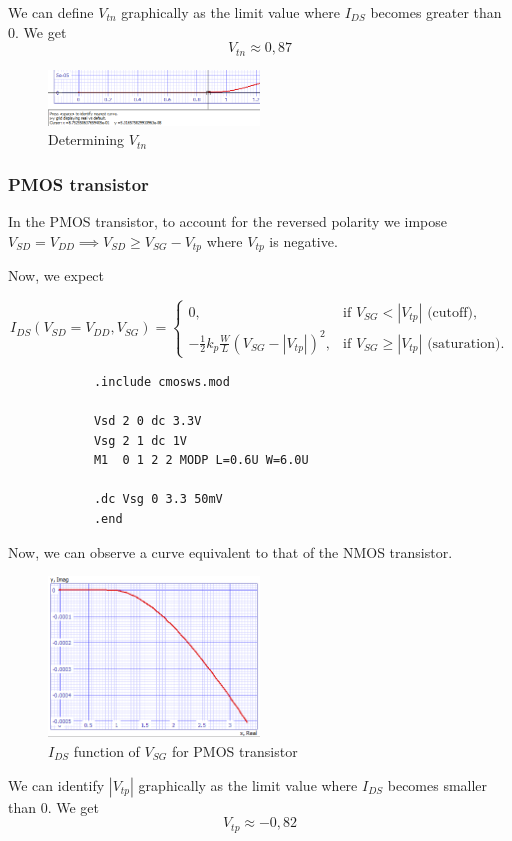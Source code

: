 \documentclass[../main.tex]{subfiles}
\begin{document}
{{		We can define $V_{tn}$ graphically as the limit value where $I_{DS}$ becomes greater than $0$. We get $$V_{tn} \approx 0,87$$
		
		\begin{figure}[H]
			\centering
			\includegraphics[width=0.5\textwidth]{plots/Q1_vtn.png}
			\caption{Determining $V_{tn}$}
		\end{figure}
		
		
		}
		\subsubsection{PMOS transistor}
		{
			
		In the PMOS transistor, to account for the reversed polarity we impose $V_{SD} = V_{DD} \implies V_{SD} \geq V_{SG} - V_{tp} $ where $V_{tp}$ is negative.
		
		Now, we expect
		
		\begin{equation}
			I_{DS}(V_{SD} = V_{DD}, V_{SG}) = 
			\begin{cases} 
				0, & \text{if } V_{SG} < |V_{tp}| \text{ (cutoff)}, \\[5pt]
				-\frac{1}{2} k_p \frac{W}{L} (V_{SG} - |V_{tp}|)^2, & \text{if } V_{SG} \geq |V_{tp}| \text{ (saturation)}.
			\end{cases}
		\end{equation}
		
		\begin{lstlisting}
			.include cmosws.mod
			
			Vsd 2 0 dc 3.3V
			Vsg 2 1 dc 1V
			M1  0 1 2 2 MODP L=0.6U W=6.0U
			
			.dc Vsg 0 3.3 50mV
			.end
		\end{lstlisting}
		
		Now, we can observe a curve equivalent to that of the NMOS transistor.
		
		\begin{figure}[H]
			\centering
			\includegraphics[width=0.5\textwidth]{plots/Q1_pmos.png}
			\caption{$I_{DS}$ function of $V_{SG}$ for PMOS transistor}
		\end{figure}
		
		We can identify $|V_{tp}|$ graphically as the limit value where $I_{DS}$ becomes smaller than $0$. We get $$V_{tp} \approx -0,82$$
		
		}
	}
\end{document}
